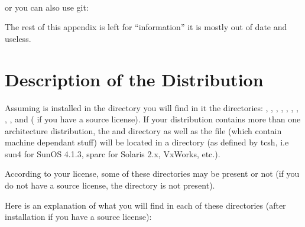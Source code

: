 \noindent{}\\

or you can also use git:

\noindent
{}


\vspace{5mm}

The rest of this appendix is left for ``information'' it is mostly out of 
date and useless. 

\section{Description of the Distribution}

Assuming \COPRSDE{} is installed in the directory  you
will find in it the directories: , , ,
, , , , ,
,  and  ( if you have a
source license).  If your distribution contains more than one architecture
distribution, the  and  directory as well as the
 file (which contain machine dependant stuff) will be located
in a  directory (as defined by tcsh, i.e sun4 for SunOS 4.1.3,
sparc for Solaris 2.x, VxWorks, etc.).

According to your license, some of these directories may be present or not (if
you do not have a source license, the  directory is not present).

Here is an explanation of what you will find in each of these directories
(after installation if you have a source license):

